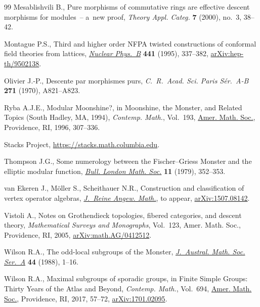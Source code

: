 \documentclass[pdftex]{sigma}
\theoremstyle{definition}
\begin{document}
\begin{thebibliography}{99}
Mesablishvili B., Pure morphisms of commutative rings are effective descent
 morphisms for modules~-- a~new proof, \textit{Theory Appl. Categ.} \textbf{7}
 (2000), no.~3, 38--42.

Montague P.S., Third and higher order {NFPA} twisted constructions of conformal
 field theories from lattices, \href{https://doi.org/10.1016/0550-3213(95)00115-9}{\textit{Nuclear Phys.~B}} \textbf{441} (1995),
 337--382, \href{https://arxiv.org/abs/hep-th/9502138}{arXiv:hep-th/9502138}.

Olivier J.-P., Descente par morphismes purs, \textit{C.~R.~Acad. Sci. Paris
 S\'{e}r.~A-B} \textbf{271} (1970), A821--A823.

Ryba A.J.E., Modular {M}oonshine?, in Moonshine, the {M}onster, and Related
 Topics ({S}outh {H}adley, {MA}, 1994), \textit{Contemp. Math.}, Vol.~193,
 \href{https://doi.org/10.1090/conm/193/02378}{Amer. Math. Soc.}, Providence, RI, 1996, 307--336.

Stacks Project, \url{https://stacks.math.columbia.edu}.

Thompson J.G., Some numerology between the {F}ischer--{G}riess {M}onster and
 the elliptic modular function, \href{https://doi.org/10.1112/blms/11.3.352}{\textit{Bull. London Math. Soc.}} \textbf{11}
 (1979), 352--353.

van Ekeren J., M\"oller S., Scheithauer N.R., Construction and classification
 of vertex operator algebras, \href{https://doi.org/10.1515/crelle-2017-0046}{\textit{J.~Reine Angew. Math.}}, {t}o appear,
 \href{https://arxiv.org/abs/1507.08142}{arXiv:1507.08142}.

Vistoli A., Notes on Grothendieck topologies, fibered categories, and descent
 theory, \textit{Mathematical Surveys and Monographs}, Vol.~123, Amer. Math.
 Soc., Providence, RI, 2005, \href{https://arxiv.org/abs/math.AG/0412512}{arXiv:math.AG/0412512}.

Wilson R.A., The odd-local subgroups of the {M}onster, \href{https://doi.org/10.1017/S1446788700031323}{\textit{J.~Austral.
 Math. Soc. Ser.~A}} \textbf{44} (1988), 1--16.

Wilson R.A., Maximal subgroups of sporadic groups, in Finite Simple Groups:
 Thirty Years of the Atlas and Beyond, \textit{Contemp. Math.}, Vol.~694,
 \href{https://doi.org/10.1090/conm/694/13974}{Amer. Math. Soc.}, Providence, RI, 2017, 57--72, \href{https://arxiv.org/abs/1701.02095}{arXiv:1701.02095}.

\end{thebibliography}\LastPageEnding
\end{document}
